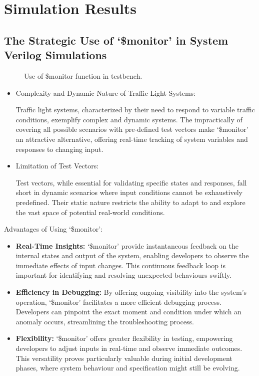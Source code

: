 \section{Simulation Results}
\subsection{The Strategic Use of `\$monitor' in System Verilog Simulations }
\begin{figure}[H]
	\centering
	\caption{Use of \$monitor function in testbench.\label{fig:monitor}}
\end{figure}
\begin{itemize}
	\item Complexity and Dynamic Nature of Traffic Light Systems:

	      Traffic light systems, characterized by their need to respond to variable traffic conditions, exemplify complex and dynamic systems. The impractically of covering all possible scenarios with pre-defined test vectors make `\$monitor' an attractive alternative, offering real-time tracking of system variables and responses to changing input.
	\item Limitation of Test Vectors:

	      Test vectors, while essential for validating specific states and responses, fall short in dynamic scenarios where input conditions cannot be exhaustively predefined. Their static nature restricts the ability to adapt to and explore the vast space of potential real-world conditions.
\end{itemize}
Advantages of Using `\$monitor':
\begin{itemize}
	\item \textbf{Real-Time Insights:} `\$monitor' provide instantaneous feedback on the internal states and output of the system, enabling developers to observe the immediate effects of input changes. This continuous feedback loop is important for identifying and resolving unexpected behaviours swiftly.
	\item \textbf{Efficiency in Debugging:} By offering ongoing visibility into the system's operation, `\$monitor' facilitates a more efficient debugging process. Developers can pinpoint the exact moment and condition under which an anomaly occurs, streamlining the troubleshooting process.
	\item \textbf{Flexibility:} `\$monitor' offers greater flexibility in testing, empowering developers to adjust inputs in real-time and observe immediate outcomes. This versatility proves particularly valuable during initial development phases, where system behaviour and specification might still be evolving.
\end{itemize}

